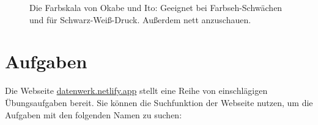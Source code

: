 \documentclass[
  letterpaper,
]{scrbook}
\theoremstyle{definition}
\theoremstyle{definition}
\theoremstyle{definition}
\theoremstyle{remark}
\begin{document}
\begin{figure}[H]


\caption{\label{fig-okabe}Die Farbskala von Okabe und Ito: Geeignet bei
Farbseh-Schwächen und für Schwarz-Weiß-Druck. Außerdem nett
anzuschauen.}

\end{figure}%

\section{Aufgaben}\label{aufgaben-3}

Die Webseite \href{https://datenwerk.netlify.app}{datenwerk.netlify.app}
stellt eine Reihe von einschlägigen Übungsaufgaben bereit. Sie können
die Suchfunktion der Webseite nutzen, um die Aufgaben mit den folgenden
Namen zu suchen:
\end{document}
